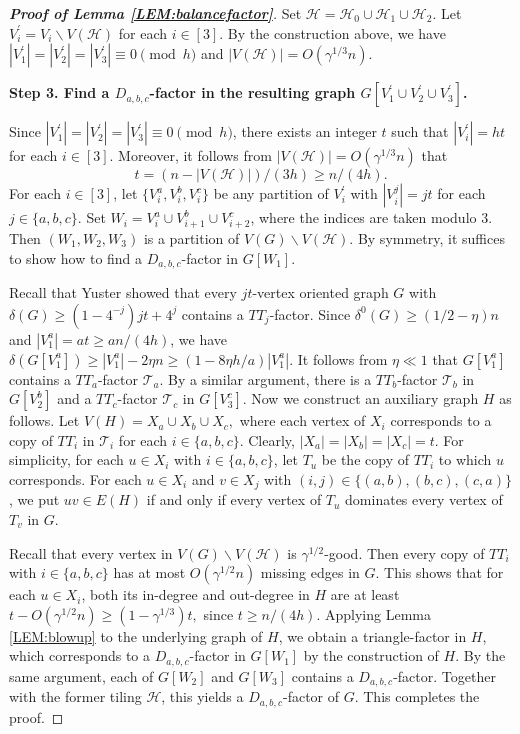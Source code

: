 \documentclass[11pt,a4paper,reqno]{amsart}
\theoremstyle{definition} %
\begin{document}
\begin{proof}[\textbf{Proof of Lemma \ref{LEM:balancefactor}}]
Set $\mathcal{H}=\mathcal{H}_0\cup \mathcal{H}_1\cup \mathcal{H}_2$. Let $V_i^{\prime}=V_i\backslash V(\mathcal{H})$ for each $i\in[3]$. By the construction above, we have $|V_1^{\prime}|=|V_2^{\prime}|=|V_3^{\prime}|\equiv0\pmod h$ and $|V(\mathcal{H})|=O(\gamma^{1/3}n)$.

\medskip
\textbf{Step 3. Find a $D_{a,b,c}$-factor in the resulting graph $G[V_1^{\prime}\cup V_2^{\prime}\cup V_3^{\prime}]$.}
\medskip

Since $|V^\prime _1|=|V^\prime _2|=|V^\prime _3|\equiv0\pmod h$, there exists an integer $t$ such that $|V^\prime _i|=ht$ for each $i\in[3]$. Moreover, it follows from $|V(\mathcal{H})|=O(\gamma^{1/3}n)$ that
$$
t=(n-|V(\mathcal{H})|)/(3h)\geqslant n/(4h).
$$
For each $i\in[3]$, let $\{V^a_i,V^b_i,V^c_i\}$ be any partition of $V^\prime _i$ with $|V^j_i|=jt$ for each $j\in\{a,b,c\}$. Set $W_i=V^a_i\cup V_{i+1}^b\cup V^c_{i+2}$, where the indices are taken modulo $3$. Then $(W_1,W_2,W_3)$ is a partition of $V(G)\backslash V(\mathcal{H})$. By symmetry, it suffices to show how to find a $D_{a,b,c}$-factor in $G[W_1]$. 

Recall that Yuster \cite{yusterorder20} showed that every $jt$-vertex oriented graph $G$ with $\delta(G)\geqslant(1-4^{-j})jt+4^j$ contains a $TT_j$-factor. Since $\delta^0(G)\geqslant (1/2-\eta)n$ and $|V^a_1|=at\geqslant an/(4h)$, we have
$
\delta(G[V_1^a])\geqslant |V_1^a|-2\eta n\geqslant (1-8\eta h/a )|V_1^a|.
$
It follows from $\eta \ll 1$ that $G[V_1^a]$ contains a $TT_a$-factor $\mathcal{T}_a$. By a similar argument, there is a $TT_b$-factor $\mathcal{T}_b$ in $G[V_2^b]$ and a $TT_c$-factor $\mathcal{T}_c$ in $G[V_3^c]$. Now we construct an auxiliary graph $H$ as follows. Let
$
V(H)=X_a\cup X_b\cup X_c,
$
where each vertex of $X_i$ corresponds to a copy of $TT_i$ in $\mathcal{T}_i$ for each $i\in\{a,b,c\}$. Clearly, $|X_a|=|X_b|=|X_c|=t$. For simplicity, for each $u\in X_i$ with $i\in\{a,b,c\}$, let $T_u$ be the copy of $TT_i$ to which $u$ corresponds. For each $u\in X_i$ and $v\in X_j$ with $(i,j)\in\{(a,b),(b,c),(c,a)\}$, we put $uv\in E(H)$ if and only if every vertex of $T_u$ dominates every vertex of $T_v$ in $G$.

Recall that every vertex in $V(G)\backslash V(\mathcal{H})$ is $\gamma^{1/2}$-good. Then every copy of $TT_i$ with $i\in\{a,b,c\}$ has at most $O(\gamma^{1/2} n)$ missing edges in $G$. This shows that for each $u\in X_i$, both its in-degree and out-degree in $H$ are at least
$
t-O(\gamma^{1/2} n)\geqslant (1-\gamma^{1/3})t,
$
since $t\geqslant n/(4h)$. Applying Lemma \ref{LEM:blowup} to the underlying graph of $H$, we obtain a triangle-factor in $H$, which corresponds to a $D_{a,b,c}$-factor in $G[W_1]$ by the construction of $H$. By the same argument, each of $G[W_2]$ and $G[W_3]$ contains a $D_{a,b,c}$-factor. Together with the former tiling $\mathcal{H}$, this yields a $D_{a,b,c}$-factor of $G$. This completes the proof.
\end{proof}
\end{document}
